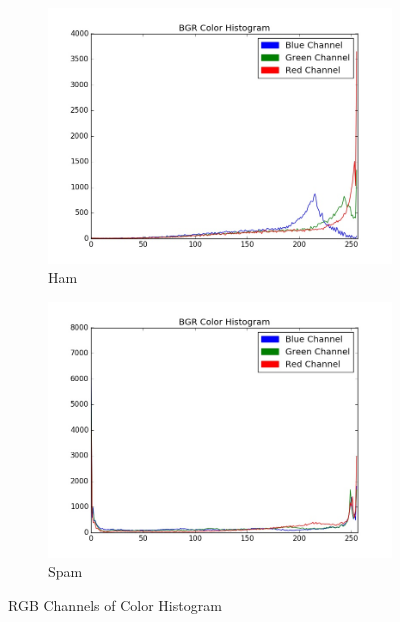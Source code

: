 \begin{itemize}
\begin{itemize}
\begin{figure}[h]
			\begin{subfigure}{0.5\textwidth}
				\includegraphics[width=0.9\linewidth]{images/ham_histogram} 
				\caption{Ham}
				\label{fig:ham_color_histograms}
			\end{subfigure}
			\begin{subfigure}{0.5\textwidth}
				\includegraphics[width=0.9\linewidth]{images/spam_histogram}
				\caption{Spam}
				\label{fig:spam_color_histograms}
			\end{subfigure}
			\caption{RGB Channels of Color Histogram}
			\label{fig:color_histograms}
		\end{figure}
	
	
	

\end{itemize}
\end{itemize}
